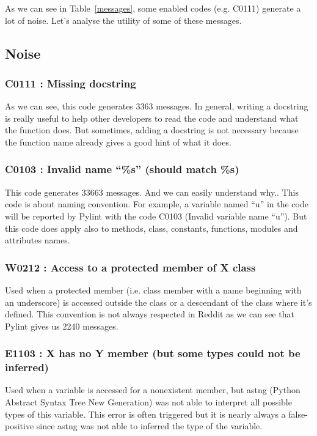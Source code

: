 \documentclass[12pt, a4paper]{article}
\newcommand{\pyl}{\textsf{Pylint}}
\begin{document}
As we can see in Table~\ref{messages}, some enabled codes (e.g. C0111) generate a lot of noise. 
Let's analyse the utility of some of these messages.
\bigskip
\subsection*{Noise}
\subsubsection*{C0111 : Missing docstring}

As we can see, this code generates 3363 messages.
In general, writing a docstring is really useful to help other developers to read the code and understand what the function does.
But sometimes, adding a docstring is not necessary because the function name already gives a good hint of what it does.


\subsubsection*{C0103 : Invalid name ``\%s''  (should match \%s) }

This code generates 33663 messages. 
And we can easily understand why.. This code is about naming convention.
For example, a variable named ``u'' in the code will be reported by \pyl{} with the code C0103 (Invalid variable name ``u'').
But this code does apply also to methods, class, constants, functions, modules and attributes names.

\subsubsection*{W0212 : Access to a protected member of X class}

Used when a protected member (i.e. class member with a name beginning with an underscore) is accessed outside the class or a descendant of the class where it's defined.
This convention is not always respected in Reddit as we can see that \pyl{} gives us 2240 messages.


\subsubsection*{E1103 : X has no Y member (but some types could not be inferred)}

Used when a variable is accessed for a nonexistent member, but astng (Python Abstract Syntax Tree New Generation) was not able to interpret all possible types of this variable.
This error is often triggered but it is nearly always a false-positive since astng was not able to inferred the type of the variable.
\end{document}
